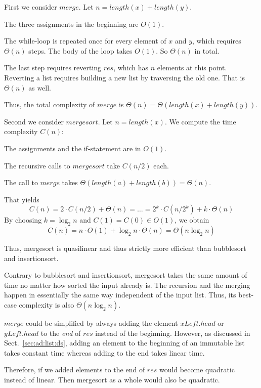 First we consider $merge$.
Let $n=length(x)+length(y)$.
\begin{compactitem}
 \item The three assignments in the beginning are $O(1)$.
 \item The while-loop is repeated once for every element of $x$ and $y$, which requires $\Theta(n)$ steps.
 The body of the loop takes $O(1)$. So $\Theta(n)$ in total.
 \item The last step requires reverting $res$, which has $n$ elements at this point.
 Reverting a list requires building a new list by traversing the old one. That is $\Theta(n)$ as well.
\end{compactitem}
Thus, the total complexity of $merge$ is $\Theta(n)=\Theta(length(x)+length(y))$.
\medskip

Second we consider $mergesort$.
Let $n=length(x)$.
We compute the time complexity $C(n)$:
\begin{compactitem}
 \item The assignments and the if-statement are in $O(1)$.
 \item The recursive calls to $mergesort$ take $C(n/2)$ each.
 \item The call to $merge$ takes $\Theta(length(a)+length(b))=\Theta(n)$.
\end{compactitem}
That yields
 \[C(n)=2\cdot C(n/2)+\Theta(n) = \ldots = 2^k\cdot C(n/2^k) + k\cdot \Theta(n)\]
 By choosing $k=\log_2 n$ and $C(1)=C(0)\in O(1)$, we obtain
 \[C(n)=n\cdot O(1)+\log_2 n\cdot \Theta(n)=\Theta(n\log_2 n)\]
\medskip

Thus, mergesort is quasilinear and thus strictly more efficient than bubblesort and insertionsort.

Contrary to bubblesort and insertionsort, mergesort takes the same amount of time no matter how sorted the input already is.
The recursion and the merging happen in essentially the same way independent of the input list.
Thus, its best-case complexity is also $\Theta(n\log_2 n)$.

\begin{remark}
$merge$ could be simplified by always adding the element $xLeft.head$ or $yLeft.head$ to the \emph{end} of $res$ instead of the beginning.
However, as discussed in Sect.~\ref{sec:ad:list:ds}, adding an element to the beginning of an immutable list takes constant time whereas adding to the end takes linear time.

Therefore, if we added elements to the end of $res$ would become quadratic instead of linear.
Then mergesort as a whole would also be quadratic.
\end{remark}

